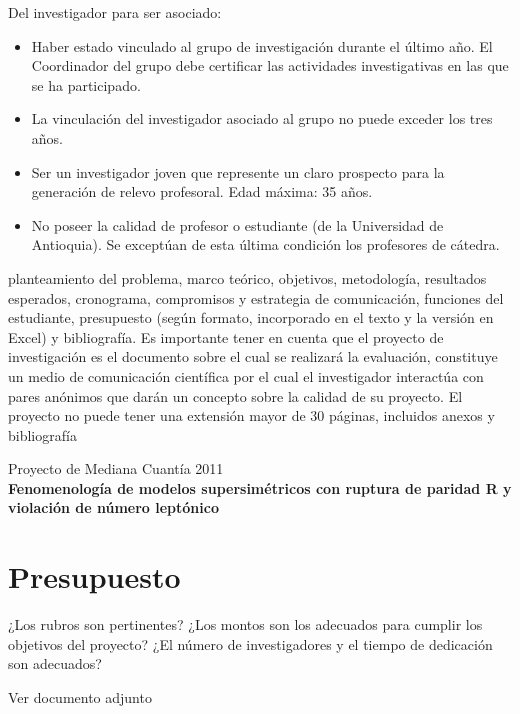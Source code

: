 \documentclass[11pt]{article}
\begin{document}
\begin{instrucciones}
  Del investigador para ser asociado:
  \begin{itemize}
  \item  Haber estado vinculado al grupo de investigación durante el último año. El Coordinador del grupo debe certificar las actividades investigativas en las que se ha participado.

  \item La vinculación del investigador asociado al grupo no puede exceder los tres años.

  \item Ser un investigador joven que represente un claro prospecto para la generación de relevo profesoral. Edad máxima: 35 años.

  \item No poseer la calidad de profesor o estudiante (de la Universidad de Antioquia). Se exceptúan de esta última condición los profesores de cátedra.
  \end{itemize}
\end{instrucciones}



\begin{instrucciones}
planteamiento del problema, marco teórico, objetivos, 
metodología, resultados esperados, cronograma, compromisos y estrategia de comunicación, funciones del 
estudiante, presupuesto (según formato, incorporado en el texto y la versión en Excel) y  bibliografía.  Es 
importante tener en cuenta que el proyecto de investigación es el documento sobre el cual se realizará la 
evaluación, constituye un medio de comunicación científica por el cual el investigador interactúa con pares 
anónimos que darán un concepto sobre la calidad de su proyecto. El proyecto no puede tener una 
extensión mayor de  30 páginas, incluidos anexos y bibliografía
\end{instrucciones}


\begin{center}
  Proyecto de Mediana Cuantía 2011\\
  \textbf{Fenomenología de modelos supersimétricos con ruptura de paridad R y violación de número leptónico} 
\end{center}

%











\section{ Presupuesto}
\begin{instrucciones}
  ¿Los rubros son pertinentes? ¿Los montos son los adecuados para cumplir los objetivos del proyecto? ¿El número de investigadores y el tiempo de dedicación son adecuados?
\end{instrucciones}
Ver documento adjunto 


\end{document}
